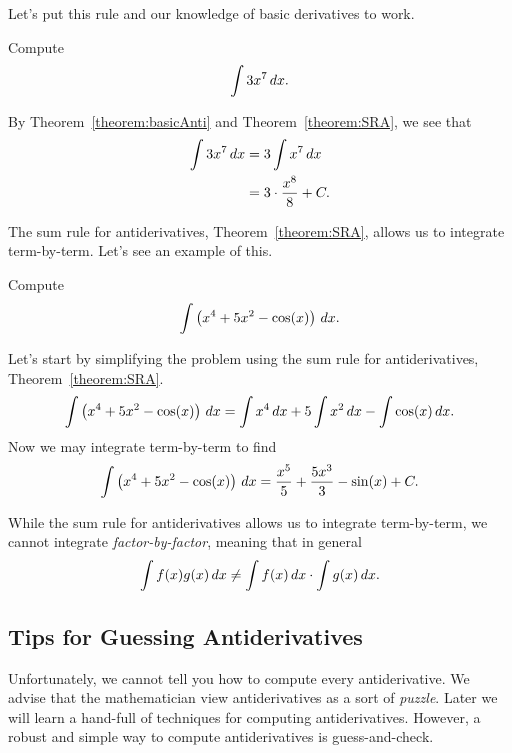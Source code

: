 Let's put this rule and our knowledge of basic derivatives to work.

\begin{example}
Compute
\[
\int 3 x^7 \, d x.
\]
\end{example}

\begin{solution}
By Theorem~\ref{theorem:basicAnti} and Theorem~\ref{theorem:SRA}, we
see that
\begin{align*}
\int 3 x^7 \, d x &= 3 \int x^7 \, d x\\
&= 3 \cdot \frac{x^8}{8}+C.
\end{align*}
\end{solution}

The sum rule for antiderivatives, Theorem~\ref{theorem:SRA}, allows us to integrate term-by-term. Let's see an example of this.

\begin{example}
Compute
\[
\int \left(x^4 + 5x^2 - \cos(x)\right) \, d x.
\]
\end{example}

\begin{solution} 
Let's start by simplifying the problem using the sum rule for
antiderivatives, Theorem~\ref{theorem:SRA}.
\[
\int \left(x^4 + 5x^2 - \cos(x)\right) \, d x = \int x^4 \, d x + 5\int x^2 \, d x - \int \cos(x) \, d x.
\]
Now we may integrate term-by-term to find
\[
\int \left(x^4 + 5x^2 - \cos(x)\right) \, d x = \frac{x^5}{5} + \frac{5x^3}{3}  - \sin(x)+C.
\]
\end{solution}


\begin{warning}
While the sum rule for antiderivatives allows us to integrate
term-by-term, we cannot integrate \textit{factor-by-factor}, meaning
that in general
\[
\int f(x)g(x) \, d x \ne \int f(x) \, d x\cdot \int g(x) \, d x.
\]
\end{warning}








\subsection*{Tips for Guessing Antiderivatives}


Unfortunately, we cannot tell you how to compute every antiderivative.
We advise that the mathematician view antiderivatives as a sort of
\textit{puzzle}. Later we will learn a hand-full of techniques for
computing antiderivatives. However, a robust and simple way to compute
antiderivatives is guess-and-check.


